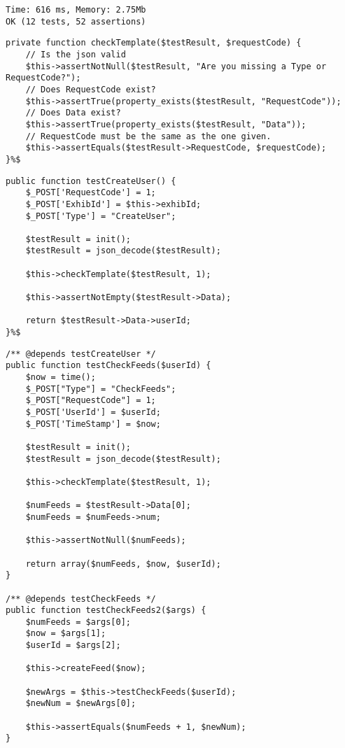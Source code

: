 \begin{lstlisting}[numbers=none]
Time: 616 ms, Memory: 2.75Mb
OK (12 tests, 52 assertions)
\end{lstlisting}

\begin{lstlisting}[language=phpstyle, label=lst:checkTemplate, caption={checkTemplate unit test}]
private function checkTemplate($testResult, $requestCode) {
    // Is the json valid
    $this->assertNotNull($testResult, "Are you missing a Type or RequestCode?");
    // Does RequestCode exist?
    $this->assertTrue(property_exists($testResult, "RequestCode"));
    // Does Data exist?
    $this->assertTrue(property_exists($testResult, "Data"));    
    // RequestCode must be the same as the one given.
    $this->assertEquals($testResult->RequestCode, $requestCode);
}%$
\end{lstlisting}

\begin{lstlisting}[language=phpstyle, label=lst:testCreateUser, caption={createUser unit test}]
public function testCreateUser() {
    $_POST['RequestCode'] = 1;
    $_POST['ExhibId'] = $this->exhibId;
    $_POST['Type'] = "CreateUser";

    $testResult = init();
    $testResult = json_decode($testResult);

    $this->checkTemplate($testResult, 1);

    $this->assertNotEmpty($testResult->Data);
    
    return $testResult->Data->userId;      
}%$
\end{lstlisting}

\begin{lstlisting}[language=phpstyle, label=lst:testCheckFeeds, caption={checkFeeds unit test}]
/** @depends testCreateUser */
public function testCheckFeeds($userId) {
    $now = time();
    $_POST["Type"] = "CheckFeeds";
    $_POST["RequestCode"] = 1;
    $_POST['UserId'] = $userId;
    $_POST['TimeStamp'] = $now;

    $testResult = init();
    $testResult = json_decode($testResult);

    $this->checkTemplate($testResult, 1);

    $numFeeds = $testResult->Data[0];
    $numFeeds = $numFeeds->num;

    $this->assertNotNull($numFeeds);

    return array($numFeeds, $now, $userId);
}

/** @depends testCheckFeeds */
public function testCheckFeeds2($args) {
    $numFeeds = $args[0];
    $now = $args[1];
    $userId = $args[2];

    $this->createFeed($now);
    
    $newArgs = $this->testCheckFeeds($userId);
    $newNum = $newArgs[0];
    
    $this->assertEquals($numFeeds + 1, $newNum);
}
\end{lstlisting}
